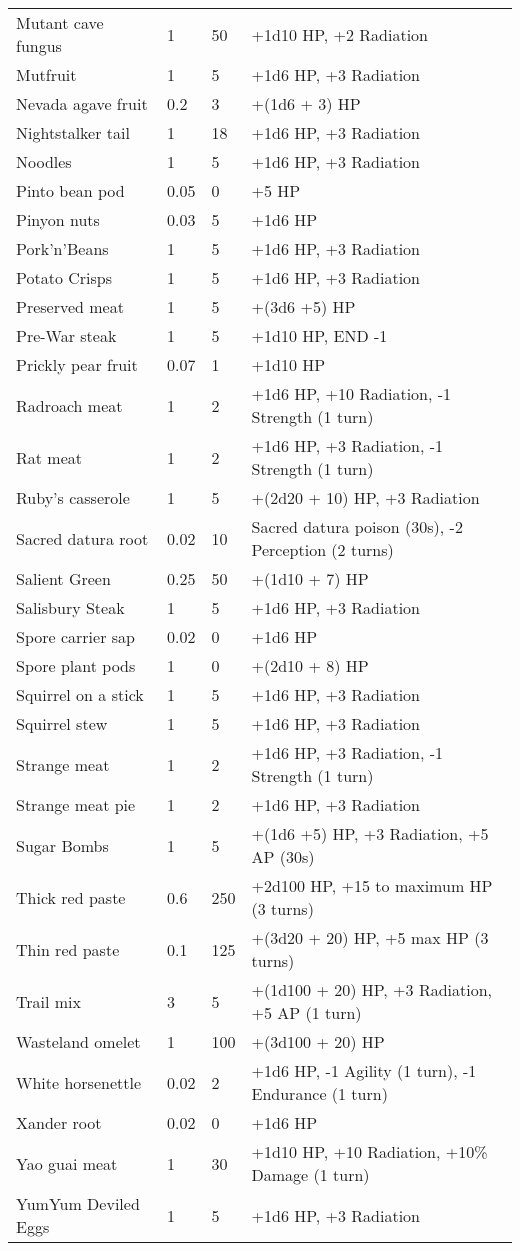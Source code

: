\begin{longtable}{|p{4cm}|p{1.5cm}|p{1.5cm}|p{9cm}|}
Mutant cave fungus  & 1 & 50 & +1d10 HP, +2 Radiation \\
Mutfruit  & 1 & 5 & +1d6 HP, +3 Radiation \\
Nevada agave fruit  & 0.2  & 3 & +(1d6 + 3) HP \\
Nightstalker tail  & 1 & 18 & +1d6 HP, +3 Radiation \\
Noodles  & 1 & 5 & +1d6 HP, +3 Radiation \\
Pinto bean pod  & 0.05  & 0 & +5 HP \\
Pinyon nuts  & 0.03  & 5 & +1d6 HP \\
Pork'n'Beans  & 1 & 5 & +1d6 HP, +3 Radiation \\
Potato Crisps  & 1 & 5 & +1d6 HP, +3 Radiation \\
Preserved meat  & 1 & 5 & +(3d6 +5) HP \\
Pre-War steak  & 1 & 5 & +1d10 HP, END -1 \\
Prickly pear fruit  & 0.07  & 1 & +1d10 HP \\
Radroach meat  & 1 & 2 & +1d6 HP, +10 Radiation, -1 Strength (1 turn) \\
Rat meat  & 1 & 2 & +1d6 HP, +3 Radiation, -1 Strength (1 turn) \\
Ruby's casserole  & 1 & 5 & +(2d20 + 10) HP, +3 Radiation \\
Sacred datura root  & 0.02  & 10 & Sacred datura poison (30s), -2 Perception (2 turns) \\
Salient Green  & 0.25  & 50 & +(1d10 + 7) HP \\
Salisbury Steak  & 1 & 5 & +1d6 HP, +3 Radiation \\
Spore carrier sap  & 0.02  & 0 & +1d6 HP \\
Spore plant pods  & 1 & 0 & +(2d10 + 8) HP \\
Squirrel on a stick  & 1 & 5 & +1d6 HP, +3 Radiation \\
Squirrel stew  & 1 & 5 & +1d6 HP, +3 Radiation \\
Strange meat  & 1 & 2 & +1d6 HP, +3 Radiation, -1 Strength (1 turn) \\
Strange meat pie  & 1 & 2 & +1d6 HP, +3 Radiation \\
Sugar Bombs  & 1 & 5 & +(1d6 +5) HP, +3 Radiation, +5 AP (30s) \\
Thick red paste  & 0.6  & 250 & +2d100 HP, +15 to maximum HP (3 turns) \\
Thin red paste  & 0.1  & 125 & +(3d20 + 20) HP, +5 max HP (3 turns) \\
Trail mix  & 3 & 5 & +(1d100 + 20) HP, +3 Radiation, +5 AP (1 turn) \\
Wasteland omelet  & 1 & 100 & +(3d100 + 20) HP \\
White horsenettle  & 0.02  & 2 & +1d6 HP, -1 Agility (1 turn), -1 Endurance (1 turn) \\
Xander root  & 0.02  & 0 & +1d6 HP \\
Yao guai meat  & 1 & 30 & +1d10 HP, +10 Radiation, +10\% Damage (1 turn) \\
YumYum Deviled Eggs  & 1 & 5 & +1d6 HP, +3 Radiation \\
\hline

\end{longtable}
